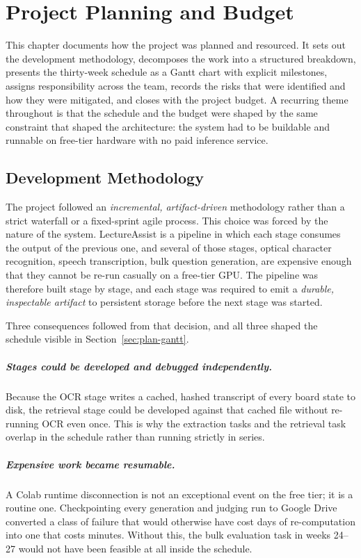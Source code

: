 \chapter{Project Planning and Budget}
\label{ch:planning}

This chapter documents how the project was planned and resourced. It sets out the
development methodology, decomposes the work into a structured breakdown, presents
the thirty-week schedule as a Gantt chart with explicit milestones, assigns
responsibility across the team, records the risks that were identified and how they
were mitigated, and closes with the project budget. A recurring theme throughout is
that the schedule and the budget were shaped by the same constraint that shaped the
architecture: the system had to be buildable and runnable on free-tier hardware with
no paid inference service.

\section{Development Methodology}
\label{sec:plan-method}

The project followed an \emph{incremental, artifact-driven} methodology rather
than a strict waterfall or a fixed-sprint agile process. This choice was
forced by the nature of the system. LectureAssist is a pipeline in which each
stage consumes the output of the previous one, and several of those stages,
optical character recognition, speech transcription, bulk question generation,
are expensive enough that they cannot be re-run casually on a free-tier GPU.
The pipeline was therefore built stage by stage, and each stage was required
to emit a \emph{durable, inspectable artifact} to persistent storage before
the next stage was started.

Three consequences followed from that decision, and all three shaped the schedule
visible in Section~\ref{sec:plan-gantt}.

\paragraph{Stages could be developed and debugged independently.} Because the OCR
stage writes a cached, hashed transcript of every board state to disk, the retrieval
stage could be developed against that cached file without re-running OCR even once.
This is why the extraction tasks and the retrieval task overlap in the schedule
rather than running strictly in series.

\paragraph{Expensive work became resumable.} A Colab runtime disconnection is not an
exceptional event on the free tier; it is a routine one. Checkpointing every
generation and judging run to Google Drive converted a class of failure that would
otherwise have cost days of re-computation into one that costs minutes. Without this,
the bulk evaluation task in weeks 24--27 would not have been feasible at all inside
the schedule.


